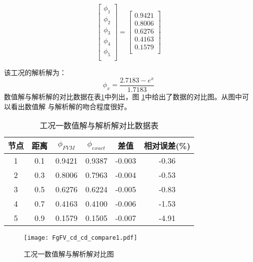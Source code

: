 \begin{equation}
  \begin{bmatrix}
    \phi_{1} \\
    \phi_{2} \\
    \phi_{3} \\
    \phi_{4} \\
    \phi_{5} \\
  \end{bmatrix}
  =
  \begin{bmatrix}
    0.9421\\
    0.8006 \\
    0.6276 \\
    0.4163 \\
    0.1579 \\
  \end{bmatrix}
\end{equation}

该工况的解析解为：
\begin{equation}
  \phi_{x}
  =
  \frac{2.7183-e^{x}}{1.7183}
\end{equation}
数值解与解析解的对比数据在表\ref{TbFV_cd_cd_compare1}中列出，图
\ref{FgFV_cd_cd_compare1}中给出了数据的对比图。从图中可以看出数值解
与解析解的吻合程度很好。
\begin{table}[H]
  \begin{center}
    \caption{工况一数值解与解析解对比数据表}
  \label{TbFV_cd_cd_compare1}
  \begin{tabular}{|c|c|c|c|c|c|}
    \hline
    节点 & 距离 & $\phi_{FVM}$ & $\phi_{exact}$ & 差值 & 相对误差(\%) \\
    \hline
    1 & 0.1 & 0.9421 & 0.9387 & -0.003  & -0.36 \\
    2 & 0.3 & 0.8006 & 0.7963 & -0.004  & -0.53 \\
    3 & 0.5 & 0.6276 & 0.6224 & -0.005  & -0.83 \\
    4 & 0.7 & 0.4163 & 0.4100 & -0.006  & -1.53 \\
    5 & 0.9 & 0.1579 & 0.1505 & -0.007  & -4.91 \\
    \hline
  \end{tabular}
  \end{center}
\end{table}

\begin{figure}[H]
  \centering
  \texttt{[image: FgFV\_cd\_cd\_compare1.pdf]}
  \caption{工况一数值解与解析解对比图}
  \label{FgFV_cd_cd_compare1}
\end{figure}

